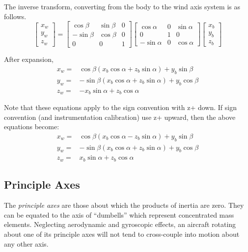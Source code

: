 \documentclass[
]{book}
\begin{document}
The inverse transform, converting from the body to the wind axis system is as follows.
\[
\begin{bmatrix}
x_w \\
y_w \\
z_w
\end{bmatrix} = 
\begin{bmatrix}
\cos \beta & \sin \beta & 0 \\
-\sin \beta & \cos \beta & 0 \\
0 & 0 & 1
\end{bmatrix}
\begin{bmatrix}
\cos \alpha & 0 & \sin \alpha \\
0 & 1 & 0 \\
-\sin \alpha & 0 & \cos \alpha
\end{bmatrix}
\begin{bmatrix}
x_b \\
y_b \\
z_b 
\end{bmatrix}
\]

After expansion,
\begin{align}
x_w =& \cos \beta (x_b \cos \alpha + z_b \sin \alpha) + y_b \sin \beta \\
y_w =& -\sin \beta(x_b \cos \alpha + z_b \sin \alpha) + y_b \cos \beta \\
z_w =& -x_b \sin \alpha + z_b \cos \alpha 
\end{align}

Note that these equations apply to the sign convention with z+ down. If sign convention (and instrumentation calibration) use z+ upward, then the above equations become:
\begin{align}
x_w =& \cos \beta (x_b \cos \alpha - z_b \sin \alpha) + y_b \sin \beta \\
y_w =& -\sin \beta(x_b \cos \alpha + z_b \sin \alpha) + y_b \cos \beta \\
z_w =& x_b \sin \alpha + z_b \cos \alpha 
\end{align}

\hypertarget{principle-axes}{%
\subsection{Principle Axes}\label{principle-axes}}

The \emph{principle axes} are those about which the products of inertia are zero. They can be equated to the axis of ``dumbells'' which represent concentrated mass elements. Neglecting aerodynamic and gyroscopic effects, an aircraft rotating about one of its principle axes will not tend to cross-couple into motion about any other axis.
\end{document}

